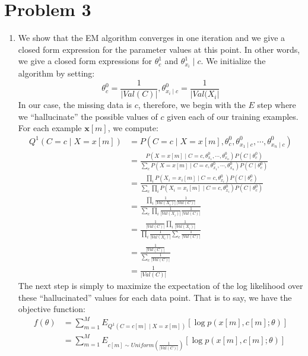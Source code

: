 \documentclass[12pt]{article}
\newcommand{\vect}[1]{\boldsymbol{#1}}
\begin{document}
\section*{Problem 3}

\begin{enumerate}[label=(\alph*)]
	\item We show that the EM algorithm converges in one iteration and we give a closed form expression for the parameter values at this point. In other words, we give a closed form expressions for $\theta_c^1$ and $\theta^1_{x_i} \mid c$. We initialize the algorithm by setting:
	$$
		\theta_c^0 = \frac{1}{|Val(C)|}, \theta_{x_i \mid c}^0 = \frac{1}{|Val(X_i|}
	$$
	In our case, the missing data is $c$, therefore, we begin with the $E$ step where we ``hallucinate'' the possible values of $c$ given each of our training examples. For each example $\vect{x}[m]$, we compute:
	\begin{align*}
		Q^1(C = c \mid X = x[m]) &= P(C = c \mid X = x[m], \theta^0_c, \theta^0_{x_1 \mid c}, \cdots, \theta^0_{x_n \mid c}) \\
		&= \frac{P(X = x[m] \mid C = c, \theta^0_{x_1}, \cdots,\theta^0_{x_n})P(C \mid \theta^0_c)}{\sum_{c} P(X = x[m] \mid C = c, \theta^0_{x_1}, \cdots, \theta^0_{x_n})P(C \mid \theta^0_c)} \tag{Bayes Rule and Conditional Independence} \\
		&= \frac{\prod_i P(X_i = x_i[m] \mid C = c, \theta^0_{x_i})P(C \mid \theta_c^0)}{\sum_c \prod_i P(X_i = x_i[m] \mid C = c, \theta^0_{x_i})P(C \mid \theta_c^0)} \\
		&= \frac{\prod_i \frac{1}{|Val(X_i)|} \frac{1}{|Val(C)|}}{\sum_c \prod_i \frac{1}{|Val(X_i)|} \frac{1}{|Val(C)|}} \\
		&= \frac{\frac{1}{|Val(C)|}\prod_i \frac{1}{|Val(X_i)|}}{\prod_i \frac{1}{|Val(X_i)|} \sum_c \frac{1}{|Val(C)|}} \\
		&= \frac{\frac{1}{|Val(C)|}}{\sum_c \frac{1}{|Val(C)|}} \\
		&= \frac{1}{|Val(C)|}
	\end{align*}
	The next step is simply to maximize the expectation of the log likelihood over these ``hallucinated'' values for each data point. That is to say, we have the objective function:
	\begin{align*}
		f(\theta) &= \sum_{m=1}^M E_{Q^1(C = c[m] \mid X = x[m])}[\log p(x[m], c[m]; \theta)] \\
		&= \sum_{m=1}^M E_{c[m] \sim Uniform(\frac{1}{|Val(C)|})}[\log p(x[m], c[m]; \theta)] 
	\end{align*}

\end{enumerate}
\end{document}
